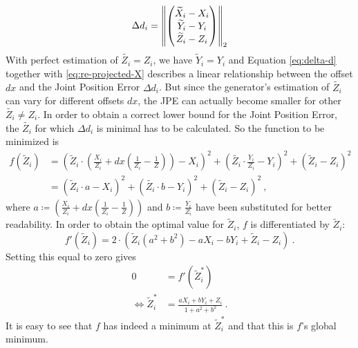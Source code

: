 \begin{equation}
\label{eq:delta-d}
	\Delta d_i = \norm{ 
	\begin{pmatrix}
		\widetilde{X}_i - X_i \\
		\widetilde{Y}_i - Y_i \\
		\widetilde{Z}_i - Z_i
	\end{pmatrix}
	}_2
\end{equation}
With perfect estimation of $\widetilde{Z_i} = Z_i$, we have $\widetilde{Y}_i = Y_i$ and Equation \eqref{eq:delta-d} together with \eqref{eq:re-projected-X} describes a linear relationship between the offset $dx$ and the Joint Position Error $\Delta d_i$.
But since the generator's estimation of $\widetilde{Z_i}$ can vary for different offsets $dx$, the JPE can actually become smaller for other $\widetilde{Z_i} \neq Z_i$. 
In order to obtain a correct lower bound for the Joint Position Error, the $\widetilde{Z_i}$ for which $\Delta d_i$ is minimal has to be calculated.
So the function to be minimized is
\begin{align}
	\label{eq:minimum-distance}
	f(\widetilde{Z}_i) &= \left ( \widetilde{Z}_i \cdot \left( \frac{X_i}{Z_i} + dx \left( \frac{1}{Z_i} - \frac{1}{Z} \right) \right ) - X_i \right)^2 + \left ( \widetilde{Z_i} \cdot \frac{Y_i}{Z_i} - Y_i \right )^2 + \left ( \widetilde{Z}_i - Z_i \right ) ^2 \\
	&= \left ( \widetilde{Z}_i \cdot a - X_i \right)^2 + \left ( \widetilde{Z_i} \cdot b - Y_i \right )^2 + \left ( \widetilde{Z}_i - Z_i \right )^2 \ ,
\end{align}
where $a \coloneqq \left( \frac{X_i}{Z_i} + dx \left( \frac{1}{Z_i} - \frac{1}{Z} \right) \right )$ and $b \coloneqq \frac{Y_i}{Z_i}$ have been substituted for better readability.
In order to obtain the optimal value for $\widetilde{Z}_i$, $f$ is differentiated by $\widetilde{Z}_i$:
\begin{equation}
	\label{eq:derivative-minimum-distance}
	f'(\widetilde{Z}_i) = 2 \cdot \left ( \widetilde{Z}_i \left (a^2 + b^2 \right ) - a X_i - b Y_i + \widetilde{Z}_i - Z_i \right ) \ .
\end{equation}
Setting this equal to zero gives
\begin{align}
	0 &= f'(\widetilde{Z}_i^\ast) \\
	\Leftrightarrow \widetilde{Z}_i^\ast & = \frac{a X_i + b Y_i + Z_i}{1 + a^2 + b^2} \ .
	\label{eq:z_i-min}
\end{align}
It is easy to see that $f$ has indeed a minimum at $\widetilde{Z}_i^\ast$ and that this is $f$'s global minimum.
